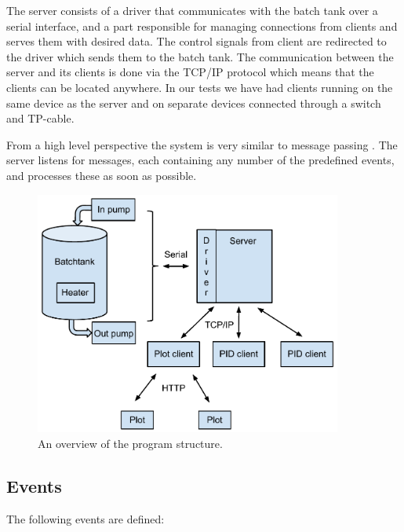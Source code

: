 \documentclass{article}
\begin{document}
The server consists of a driver that communicates with the batch tank over a
serial interface, and a part responsible for managing connections from
clients and serves them with desired data. The control signals from client are redirected to the driver which sends them to the batch tank. The communication
between the server and its clients is done via the TCP/IP protocol which means
that the clients can be located anywhere. In our tests we have had clients
running on the same device as the server and on separate devices connected
through a switch and TP-cable.

From a high level perspective the system is very similar to message
passing \cite[p.~71]{rtcs}. The server listens for messages, each
containing any number of the predefined events, and processes these as
soon as possible.

\begin{figure}[H]
\includegraphics[width=0.9\textwidth]{systemoverview.pdf}
\caption{An overview of the program structure.}
\label{fig:system overview}
\end{figure}

\subsection{Events}
The following events are defined:
\end{document}
